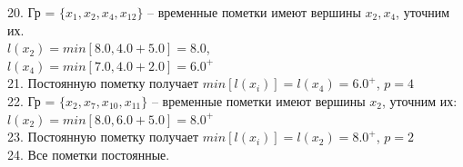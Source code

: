 \documentclass[a4paper,12pt]{article}
\begin{document}
20. Гр = $\{x_{1}, x_{2}, x_{4}, x_{12}\}$ – временные пометки имеют вершины $x_{2}, x_{4}$, уточним их. \\
\indent $l(x_{2}) = min[8.0, 4.0 + 5.0] = 8.0$, \\
\indent $l(x_{4}) = min[7.0, 4.0 + 2.0] = 6.0^+$ \\
21. Постоянную пометку получает $min[l(x_i)] = l(x_{4}) = 6.0^+$, $p = 4$ \\
22. Гр = $\{x_{2}, x_{7}, x_{10}, x_{11}\}$ – временные пометки имеют вершины $x_{2}$, уточним их: \\
\indent $l(x_{2}) = min[8.0, 6.0 + 5.0] = 8.0^+$ \\
23. Постоянную пометку получает $min[l(x_i)] = l(x_{2}) = 8.0^+$, $p = 2$ \\
24. Все пометки постоянные. \\
\end{document}
